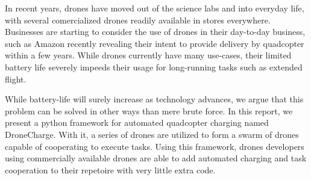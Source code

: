 In recent years, drones have moved out of the science labs and into everyday life, with several comercialized drones readily available in stores everywhere. Businesses are starting to consider the use of drones in their day-to-day business, such as Amazon recently revealing their intent to provide delivery by quadcopter within a few years. While drones currently have many use-cases, their limited battery life severely impeeds their usage for long-running tasks such as extended flight.

While battery-life will surely increase as technology advances, we argue that this problem can be solved in other ways than mere brute force. In this report, we present a python framework for automated quadcopter charging named DroneCharge. With it, a series of drones are utilized to form a swarm of drones capable of cooperating to execute tasks. Using this framework, drones developers using commercially available drones are able to add automated charging and task cooperation to their repetoire with very little extra code.